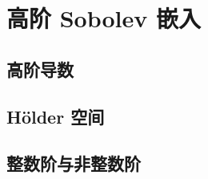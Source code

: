 \section{高阶 Sobolev 嵌入}
\label{b1:sec:2404}


\subsection{高阶导数}
\label{b1:subsec:240401}

\subsection{Hölder 空间}
\label{b1:subsec:240402}

\subsection{整数阶与非整数阶}
\label{b1:subsec:240403}


